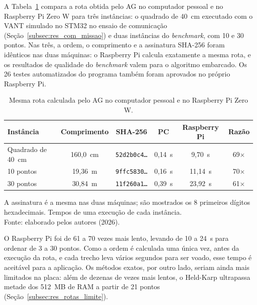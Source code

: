 A Tabela~\ref{tab:rotas_pi} compara a rota obtida pelo AG no computador pessoal e no Raspberry Pi Zero W para três instâncias: o quadrado de 40~cm executado com o VANT simulado no STM32 no ensaio de comunicação (Seção~\ref{subsec:res_com_missao}) e duas instâncias do \textit{benchmark}, com 10 e 30 pontos. Nas três, a ordem, o comprimento e a assinatura SHA-256 foram idênticos nas duas máquinas: o Raspberry Pi calcula exatamente a mesma rota, e os resultados de qualidade do \textit{benchmark} valem para o algoritmo embarcado. Os 26 testes automatizados do programa também foram aprovados no próprio Raspberry Pi.

\begin{table}[H]
    \centering
    \caption{Mesma rota calculada pelo AG no computador pessoal e no Raspberry Pi Zero W.}
    \label{tab:rotas_pi}
    \small
    \renewcommand{\arraystretch}{1.2}
    \begin{tabular}{lccccc}
        \hline
        \textbf{Instância} & \textbf{Comprimento} & \textbf{SHA-256} & \textbf{PC} & \textbf{Raspberry Pi} & \textbf{Razão} \\
        \hline
        Quadrado de 40~cm & 160,0~cm & \texttt{52d2b0c4\ldots} & 0,14~s & 9,70~s & 69$\times$ \\
        10 pontos & 19,36~m & \texttt{9ffc5830\ldots} & 0,16~s & 11,14~s & 70$\times$ \\
        30 pontos & 30,84~m & \texttt{11f260a1\ldots} & 0,39~s & 23,92~s & 61$\times$ \\
        \hline
    \end{tabular}
    \par\vspace{0.15cm}
    \footnotesize A assinatura é a mesma nas duas máquinas; são mostrados os 8 primeiros dígitos hexadecimais. Tempos de uma execução de cada instância.\\
    Fonte: elaborado pelos autores (2026).
\end{table}

O Raspberry Pi foi de 61 a 70 vezes mais lento, levando de 10 a 24~s para ordenar de 3 a 30 pontos. Como a ordem é calculada uma única vez, antes da execução da rota, e cada trecho leva vários segundos para ser voado, esse tempo é aceitável para a aplicação. Os métodos exatos, por outro lado, seriam ainda mais limitados na placa: além de dezenas de vezes mais lentos, o Held-Karp ultrapassa metade dos 512~MB de RAM a partir de 21 pontos (Seção~\ref{subsec:res_rotas_limite}).

